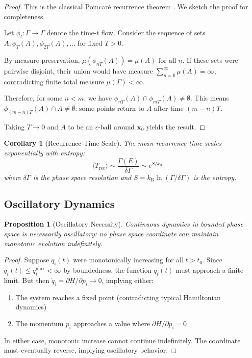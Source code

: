 \documentclass[twocolumn,10pt,twoside]{article}
\newtheorem{proposition}[theorem]{Proposition}
\newtheorem{corollary}[theorem]{Corollary}
\newcommand{\kb}{k_{\mathrm{B}}}
\begin{document}
\begin{proof}
This is the classical Poincar\'{e} recurrence theorem \cite{poincare1890}. We sketch the proof for completeness.

Let $\phi_t: \Gamma \to \Gamma$ denote the time-$t$ flow. Consider the sequence of sets $A, \phi_T(A), \phi_{2T}(A), \ldots$ for fixed $T > 0$.

By measure preservation, $\mu(\phi_{nT}(A)) = \mu(A)$ for all $n$. If these sets were pairwise disjoint, their union would have measure $\sum_{n=0}^{\infty} \mu(A) = \infty$, contradicting finite total measure $\mu(\Gamma) < \infty$.

Therefore, for some $n < m$, we have $\phi_{nT}(A) \cap \phi_{mT}(A) \neq \emptyset$. This means $\phi_{(m-n)T}(A) \cap A \neq \emptyset$: some points return to $A$ after time $(m-n)T$.

Taking $T \to 0$ and $A$ to be an $\epsilon$-ball around $\mathbf{x}_0$ yields the result.
\end{proof}

\begin{corollary}[Recurrence Time Scale]
The mean recurrence time scales exponentially with entropy:
\begin{equation}
\langle T_{\text{rec}} \rangle \sim \frac{\Gamma(E)}{\delta\Gamma} \sim e^{S/\kb}
\label{eq:recurrence_time}
\end{equation}
where $\delta\Gamma$ is the phase space resolution and $S = \kb \ln(\Gamma/\delta\Gamma)$ is the entropy.
\end{corollary}

\subsection{Oscillatory Dynamics}

\begin{proposition}[Oscillatory Necessity]
\label{prop:oscillatory}
Continuous dynamics in bounded phase space is necessarily oscillatory: no phase space coordinate can maintain monotonic evolution indefinitely.
\end{proposition}

\begin{proof}
Suppose $q_i(t)$ were monotonically increasing for all $t > t_0$. Since $q_i(t) \leq q_i^{\max} < \infty$ by boundedness, the function $q_i(t)$ must approach a finite limit. But then $\dot{q}_i = \partial H/\partial p_i \to 0$, implying either:
\begin{enumerate}
    \item The system reaches a fixed point (contradicting typical Hamiltonian dynamics)
    \item The momentum $p_i$ approaches a value where $\partial H/\partial p_i = 0$
\end{enumerate}

In either case, monotonic increase cannot continue indefinitely. The coordinate must eventually reverse, implying oscillatory behavior.
\end{proof}
\end{document}
